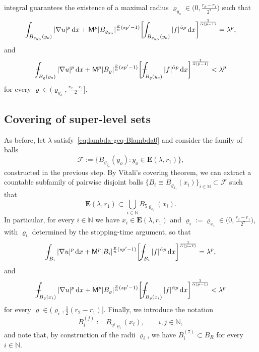 \documentclass[10pt,letterpaper]{amsart}
\theoremstyle{definition}
\numberwithin{theorem}{section}
\numberwithin{equation}{section}
\newcommand{\1}{\ensuremath{\mathds{1}}}
\newcommand{\dx}{\mathrm{d}x}
\def\Xint#1{\mathchoice
    {\XXint\displaystyle\textstyle{#1}}%
    {\XXint\textstyle\scriptstyle{#1}}%
    {\XXint\scriptstyle\scriptscriptstyle{#1}}%
    {\XXint\scriptscriptstyle\scriptscriptstyle{#1}}%
    \!\int}
\def\XXint#1#2#3{\setbox0=\hbox{$#1{#2#3}{\int}$}
    \vcenter{\hbox{$#2#3$}}\kern-0.5\wd0}
\def\bint{\Xint-}
\renewcommand{\rho}{\varrho}
\renewcommand{\rho}{\varrho}
\numberwithin{equation}{section}
\begin{document}
integral guarantees the existence of a maximal radius
\(\rho_{y_o}\in\big(0,\tfrac{r_2-r_1}{2^7}\big)\) such that
\begin{equation*}
    \bint_{B_{\rho_{y_o}}(y_o)} |\nabla u|^p \,\dx + 
    {\sf M}^p|B_{\rho_{y_o}}|^{\frac{p}{n}(sp'- 1)} \bigg[\bint_{B_{\rho_{y_o}}(y_o)} |f|^{\tilde\alpha p} \,\dx \bigg]^{\frac{1}{\tilde\alpha(p-1)}}  
    =
    \lambda^p, 
\end{equation*}
and 
\begin{equation*}%
    \bint_{B_\rho(y_o)} |\nabla u|^p \,\dx +
    {\sf M}^p|B_\rho|^{\frac{p}{n}(sp'- 1)} \bigg[\bint_{B_\rho(y_o)} |f|^{\tilde\alpha p} \,\dx \bigg]^{\frac{1}{\tilde\alpha(p-1)}}
    <
    \lambda^p 
\end{equation*}
for every $\rho\in (\rho_{y_o}, \frac{r_2-r_1}{2}]$.



\subsection{Covering of super-level sets}
As before, let \(\lambda\) satisfy~\eqref{eq:lambda-geq-Blambda0} and
consider the family of balls
\begin{equation*}
    \mathcal{F}
    :=
    \big\{
        B_{\rho_{y_o}}(y_o)
        \colon
        y_o\in \boldsymbol E(\lambda,r_1)
    \big\},
\end{equation*}
constructed in the previous step.
By Vitali's covering theorem, we can extract a countable subfamily of
pairwise disjoint balls \(\{B_i\equiv B_{\rho_{x_i}}(x_i)\}_{i\in\mathbb N}\subset\mathcal F\)
such that
\[
    \boldsymbol E(\lambda,r_1)
    \subset
    \bigcup_{i\in\mathbb N} B_{5\rho_{x_i}}(x_i).
\]
In particular, for every \(i\in\mathbb N\) we have
\(x_i\in \boldsymbol E(\lambda,r_1)\) and
\(\rho_i:=\rho_{x_i}\in\big(0,\tfrac{r_2-r_1}{2^7}\big)\), with
\(\rho_i\) determined by the stopping-time argument, so that
\begin{equation}\label{eq:intr}
    \bint_{B_i} |\nabla u|^p \,\dx +
    {\sf M}^p|B_i|^{\frac{p}{n}(sp'- 1)} \bigg[\bint_{B_i} |f|^{\tilde\alpha p} \,\dx \bigg]^{\frac{1}{\tilde\alpha(p-1)}} 
    = 
    \lambda^p,
\end{equation}
and
\begin{equation} \label{eq:stopping-time-above-maxradius}
    \bint_{B_\rho(x_i)} |\nabla u|^p \,\dx +
    {\sf M}^p|B_\rho|^{\frac{p}{n}(sp'- 1)} \bigg[\bint_{B_\rho(x_i)} |f|^{\tilde\alpha p} \,\dx \bigg]^{\frac{1}{\tilde\alpha(p-1)}}
    < 
    \lambda^p 
\end{equation}
for every $\rho\in \big(\rho_{i}, \frac12 (r_2-r_1)\big]$.
Finally, we introduce the notation
\[
    B_i^{(j)} := B_{2^j\rho_i}(x_i),
    \qquad i,j\in\mathbb N,
\]
and note that, by construction of the radii \(\rho_i\), we have
\(B_i^{(7)}\subset B_R\) for every \(i\in\mathbb N\).
\end{document}
